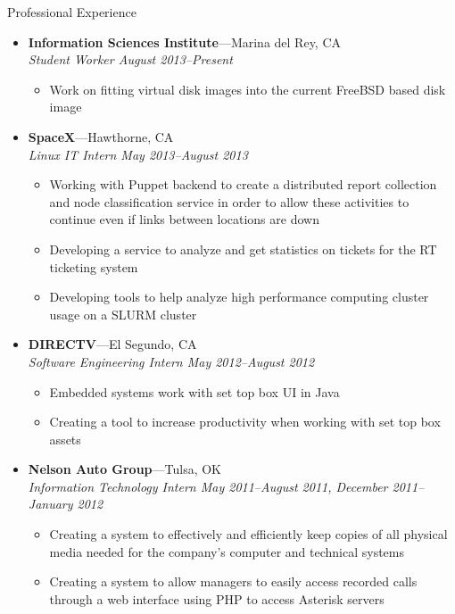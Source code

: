 \documentclass[8pt,oneside]{article}
\newenvironment{ressection}[1]{
	\vspace{4pt}
	{\fontfamily{phv}\selectfont\large#1}
	\begin{itemize}
	\vspace{3pt}
}{
	\end{itemize}
}
\newcommand{\ressubitem}[1]{
	\vspace{-1pt}
	\item \begin{flushleft} #1 \end{flushleft}
}
\newcommand{\resbigitem}[3]{
	\vspace{-5pt}
	\item
	\textbf{#1}---#2 \\
	\textit{#3}
}
\newenvironment{ressubsec}[3]{
	\resbigitem{#1}{#2}{#3}
	\vspace{-2pt}
	\begin{itemize}
}{
	\end{itemize}
}
\begin{document}
\begin{ressection}{Professional Experience}
        \begin{ressubsec}{Information Sciences Institute}{Marina del Rey, CA}{Student Worker August 2013--Present}
                \ressubitem{Work on fitting virtual disk images into the current FreeBSD based disk image}
        \end{ressubsec}
        \begin{ressubsec}{SpaceX}{Hawthorne, CA}{Linux IT Intern May 2013--August 2013}
                \ressubitem{Working with Puppet backend to create a distributed report collection and node classification service in order to allow these activities to continue even if links between locations are down}
                \ressubitem{Developing a service to analyze and get statistics on tickets for the RT ticketing system}
                \ressubitem{Developing tools to help analyze high performance computing cluster usage on a SLURM cluster}
        \end{ressubsec}
	\begin{ressubsec}{DIRECTV}{El Segundo, CA}{Software Engineering Intern May 2012--August 2012}
		\ressubitem{Embedded systems work with set top box UI in Java}
		\ressubitem{Creating a tool to increase productivity when working with set top box assets}
	\end{ressubsec}
	\begin{ressubsec}{Nelson Auto Group}{Tulsa, OK}{Information Technology Intern May 2011--August 2011, December 2011--January 2012}
		\ressubitem{Creating a system to effectively and efficiently keep copies of all physical media needed for the company's computer and technical systems}
		\ressubitem{Creating a system to allow managers to easily access recorded calls through a web interface using PHP to access Asterisk servers}
	\end{ressubsec}

	
	\begin{comment}
	\begin{ressubsec}{Tulsa Day Center For the Homeless}{Tulsa, OK}{Volunteer:  July 2006--September 2009}
		\ressubitem{Worked mainly with individuals receiving tuberculosis tests.}
		\ressubitem{Entered tuberculosis data and kept computerized records between the Day Center for the Homeless and the Tulsa City-County Health Department up to date.}
	\end{ressubsec}
	\end{comment}

\end{ressection}
\end{document}
